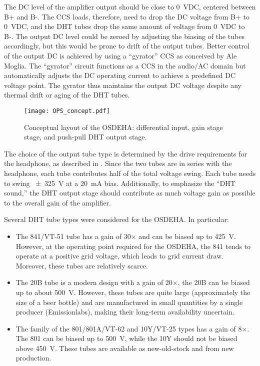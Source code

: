 The DC level of the amplifier output should be close to \SI{0}{VDC}, centered between B+ and B-. The CCS loads, therefore, need to drop the DC voltage from B+ to \SI{0}{VDC}, and the DHT tubes drop the same amount of voltage from \SI{0}{VDC} to B-. The output DC level could be zeroed by adjusting the biasing of the tubes accordingly, but this would be prone to drift of the output tubes. Better control of the output DC is achieved by using a ``gyrator'' CCS as conceived by Ale Moglia\cite{mogliaa_gyrator}. The ``gyrator'' circuit functions as a CCS in the audio/AC domain but automatically adjusts the DC operating current to achieve a predefined DC voltage point. The gyrator thus maintains the output DC voltage despite any thermal drift or aging of the DHT tubes.

\begin{figure}
\begin{center}
\texttt{[image: OPS\_concept.pdf]}
\caption{Conceptual layout of the OSDEHA: differential input, gain stage stage, and push-pull DHT output stage.}
\end{center}
\end{figure}

The choice of the output tube type is determined by the drive requirements for the headphone, as described in . Since the two tubes are in series with the headphone, each tube contributes half of the total voltage swing. Each tube needs to swing \SI{\pm325}{V} at a \SI{20}{mA} bias. Additionally, to emphasize the ``DHT sound,'' the DHT output stage should contribute as much voltage gain as possible to the overall gain of the amplifier.

Several DHT tube types were considered for the OSDEHA\cite{osdeha_p9,osdeha_whichDTH}. In particular:

\begin{itemize}
\item The 841/VT-51 tube has a gain of 30$\times$ and can be biased up to \SI{425}{V}. However, at the operating point required for the OSDEHA, the 841 tends to operate at a positive grid voltage, which leads to grid current draw. Moreover, these tubes are relatively scarce.
\item The 20B tube is a modern design with a gain of 20$\times$, the 20B can be biased up to about \SI{500}{V}. However, these tubes are quite large (approximately the size of a beer bottle) and are manufactured in small quantities by a single producer (Emissionlabs), making their long-term availability uncertain.
\item The family of the 801/801A/VT-62 and 10Y/VT-25 types has a gain of 8$\times$. The 801 can be biased up to \SI{500}{V}, while the 10Y should not be biased above \SI{450}{V}. These tubes are available as new-old-stock and from new production.
\end{itemize}

